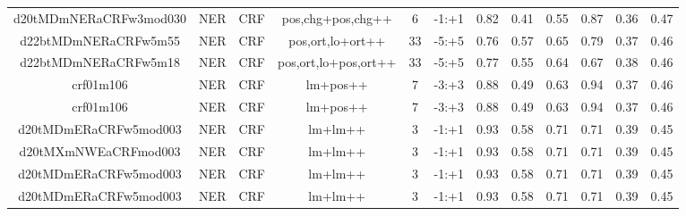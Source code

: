\documentclass[a4paper]{article}
\begin{document}
\begin{landscape}
\begin{center}
\begin{tabular}{ |c|c|c|c|c|c|c|c|c|c|c|c|}
 	
 
 	
 		
 		\small{ d20tMDmNERaCRFw3mod030 } & NER & CRF & pos,chg+pos,chg++  &  6 &  -1:+1  &  0.82 & 0.41 & 0.55  &  0.87 & 0.36 & 0.47 \\
 		

 	
 
 	
 		
 		\small{ d22btMDmNERaCRFw5m55 } & NER & CRF & pos,ort,lo+ort++  &  33 &  -5:+5  &  0.76 & 0.57 & 0.65  &  0.79 & 0.37 & 0.46 \\
 		

 	
 
 	
 		
 		\small{ d22btMDmNERaCRFw5m18 } & NER & CRF & pos,ort,lo+pos,ort++  &  33 &  -5:+5  &  0.77 & 0.55 & 0.64  &  0.67 & 0.38 & 0.46 \\
 		

 	
 
 	
 		
 		\small{ crf01m106 } & NER & CRF & lm+pos++  &  7 &  -3:+3  &  0.88 & 0.49 & 0.63  &  0.94 & 0.37 & 0.46 \\
 		

 	
 
 	
 		
 		\small{ crf01m106 } & NER & CRF & lm+pos++  &  7 &  -3:+3  &  0.88 & 0.49 & 0.63  &  0.94 & 0.37 & 0.46 \\
 		

 	
 
 	
 		
 		\small{ d20tMDmERaCRFw5mod003 } & NER & CRF & lm+lm++  &  3 &  -1:+1  &  0.93 & 0.58 & 0.71  &  0.71 & 0.39 & 0.45 \\
 		

 	
 
 	
 		
 		\small{ d20tMXmNWEaCRFmod003 } & NER & CRF & lm+lm++  &  3 &  -1:+1  &  0.93 & 0.58 & 0.71  &  0.71 & 0.39 & 0.45 \\
 		

 	
 
 	
 		
 		\small{ d20tMDmERaCRFw5mod003 } & NER & CRF & lm+lm++  &  3 &  -1:+1  &  0.93 & 0.58 & 0.71  &  0.71 & 0.39 & 0.45 \\
 		

 	
 
 	
 		
 		\small{ d20tMDmERaCRFw5mod003 } & NER & CRF & lm+lm++  &  3 &  -1:+1  &  0.93 & 0.58 & 0.71  &  0.71 & 0.39 & 0.45 \\
 		


\end{tabular}
\end{center}
\end{landscape}
\end{document}
